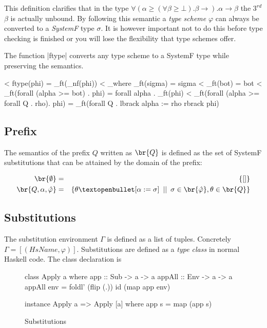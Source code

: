 This definition clarifies that in the type $\forall(\alpha \geq (\forall \beta \geq \bot). \beta \rightarrow ). \alpha \rightarrow \beta$ the $3^{rd}$ $\beta$ is actually unbound. By following this semantic a \emph{type scheme} $\varphi$ can always be converted to a \emph{SystemF} type $\sigma$. It is however important not to do this before type checking is finished or you will lose the flexibility that type schemes offer.

The function |ftype| converts any type scheme to a SystemF type while preserving the semantics.

< ftype(phi) = _ft(_nf(phi))
<    _where  _ft(sigma)                                  =  sigma
<            _ft(bot)                                    =  bot
<            _ft(forall (alpha >= bot) . phi)            =  forall alpha . _ft(phi)
<            _ft(forall (alpha >= forall Q . rho). phi)  =  _ft(forall Q . lbrack alpha := rho rbrack phi)           

\subsection{Prefix}
The semantics of the prefix $Q$ written as $\br{Q}$  is defined as the set of SystemF substitutions that can be attained by the domain of the prefix:

\begin{eqnarray*}
\br{\emptyset} & = & \{\lbrack\rbrack\} \\
\br{Q, \alpha, \hat{\varphi}} & = & \{ \theta \textopenbullet \lbrack \alpha := \sigma \rbrack \hspace{5pt} || \hspace{5pt} \sigma \in \br{\hat{\varphi}}, \theta \in \br{Q} \}
\end{eqnarray*}
\subsection{Substitutions}
The substitution environment $\Gamma$ is defined as a list of tuples. Concretely $\Gamma = [(HsName,\varphi)]$. Substitutions are defined as a \emph{type class} in normal Haskell code. The class declaration is

\begin{figure}[H]
\begin{code}
class Apply a where
  app    :: Sub -> a -> a
  appAll :: Env -> a -> a
  appAll env = foldl' (flip (.)) id (map app env)
  
instance Apply a => Apply [a] where
  app s = map (app s)
\end{code}
\label{utils:apply}
\caption{Substitutions}
\end{figure}

